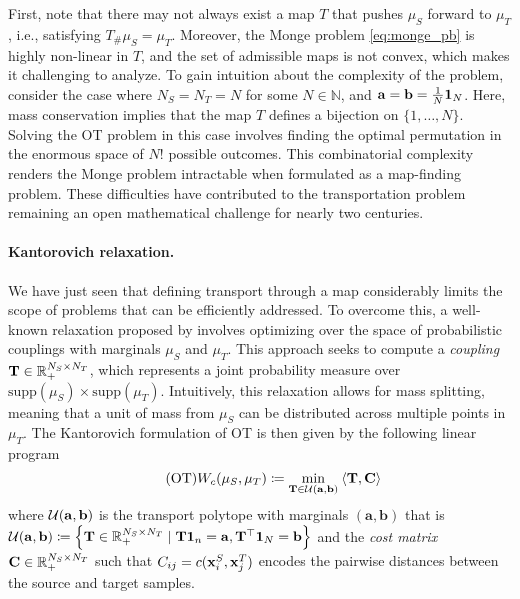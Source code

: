 First, note that there may not always exist a map \(T\) that pushes \(\mu_S\) forward to \(\mu_T\), i.e., satisfying \(T_{\#}\mu_S = \mu_T\). Moreover, the Monge problem \eqref{eq:monge_pb} is highly non-linear in \(T\), and the set of admissible maps is not convex, which makes it challenging to analyze. To gain intuition about the complexity of the problem, consider the case where \(N_S = N_T = N\) for some \(N \in \mathbb{N}\), and \({\mathbf{a}} = {\mathbf{b}} = \frac{1}{N} \mathbf{1}_N\). Here, mass conservation implies that the map \(T\) defines a bijection on \(\{1, \ldots, N\}\). Solving the OT problem in this case involves finding the optimal permutation in the enormous space of \(N!\) possible outcomes. This combinatorial complexity renders the Monge problem intractable when formulated as a map-finding problem. These difficulties have contributed to the transportation problem remaining an open mathematical challenge for nearly two centuries.


\paragraph{Kantorovich relaxation.}
We have just seen that defining transport through a map considerably limits the scope of problems that can be efficiently addressed. To overcome this, a well-known relaxation proposed by \citep{kantorovich1942translocation} involves optimizing over the space of probabilistic couplings with marginals \(\mu_S\) and \(\mu_T\). This approach seeks to compute a \emph{coupling} \({\mathbf{T}} \in \mathbb{R}_{+}^{N_S \times N_T}\), which represents a joint probability measure over \(\text{supp}(\mu_S) \times \text{supp}(\mu_T)\). Intuitively, this relaxation allows for mass splitting, meaning that a unit of mass from \(\mu_S\) can be distributed across multiple points in \(\mu_T\).
The Kantorovich formulation of OT is then given by the following linear program
\begin{equation}
    \tag{OT}
    \label{eq:OT}
    W_c(\mu_S, \mu_T) \coloneqq \min_{{\mathbf{T}} \in {\mathcal{U}}({\mathbf{a}}, {\mathbf{b}})} \: \langle {\mathbf{T}}, {\mathbf{C}} \rangle
\end{equation}
where ${\mathcal{U}}({\mathbf{a}}, {\mathbf{b}})$ is the transport polytope with marginals $(\bm{a}, \bm{b})$ that is ${\mathcal{U}}({\mathbf{a}}, {\mathbf{b}}) \coloneqq \left\{ {\mathbf{T}} \in \mathbb{R}_+^{N_S \times N_T} \mid {\mathbf{T}} \mathbf{1}_n = {\mathbf{a}}, {\mathbf{T}}^\top \mathbf{1}_N = {\mathbf{b}} \right\}$ and the \emph{cost matrix} $\mathbf{C} \in \mathbb{R}_+^{N_S \times N_T}$ such that $C_{ij} = c({\mathbf{x}}_i^S, {\mathbf{x}}_j^T)$ encodes the pairwise distances between the source and target samples. 

